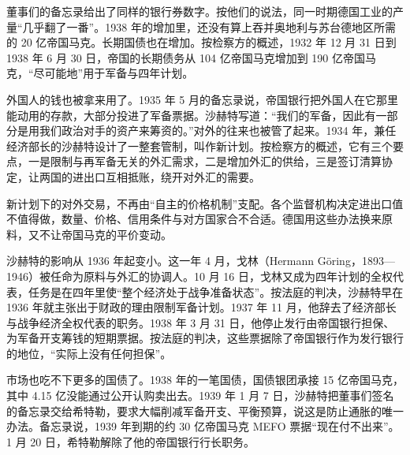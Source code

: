 董事们的备忘录给出了同样的银行券数字\cite{nca1946g}。按他们的说法，同一时期德国工业的产量“几乎翻了一番”\cite{nca1946g}。1938 年的增加里，还没有算上吞并奥地利与苏台德地区所需的 20 亿帝国马克\cite{nca1946g}。长期国债也在增加。按检察方的概述，1932 年 12 月 31 日到 1938 年 6 月 30 日，帝国的长期债务从 104 亿帝国马克增加到 190 亿帝国马克，“尽可能地”用于军备与四年计划\cite{nca1946b}。

外国人的钱也被拿来用了。1935 年 5 月的备忘录说，帝国银行把外国人在它那里能动用的存款，大部分投进了军备票据\cite{nca1946b}。沙赫特写道：“我们的军备，因此有一部分是用我们政治对手的资产来筹资的。”\cite{nca1946b}对外的往来也被管了起来。1934 年，兼任经济部长的沙赫特设计了一整套管制，叫作新计划\cite{nca1946b,nca1947}。按检察方的概述，它有三个要点，一是限制与再军备无关的外汇需求，二是增加外汇的供给，三是签订清算协定，让两国的进出口互相抵账，绕开对外汇的需要\cite{nca1946b}。

新计划下的对外交易，不再由“自主的价格机制”支配\cite{nca1946b}。各个监督机构决定进出口值不值得做，数量、价格、信用条件与对方国家合不合适\cite{nca1946b}。德国用这些办法换来原料，又不让帝国马克的平价变动。

沙赫特的影响从 1936 年起变小。这一年 4 月，戈林（Hermann Göring，1893—1946）被任命为原料与外汇的协调人\cite{nca1947,loc30}。10 月 16 日，戈林又成为四年计划的全权代表，任务是在四年里使“整个经济处于战争准备状态”\cite{nca1947}。按法庭的判决，沙赫特早在 1936 年就主张出于财政的理由限制军备计划\cite{nca1947}。1937 年 11 月，他辞去了经济部长与战争经济全权代表的职务\cite{nca1947,schacht2005}。1938 年 3 月 31 日，他停止发行由帝国银行担保、为军备开支筹钱的短期票据\cite{nca1947}。按法庭的判决，这些票据除了帝国银行作为发行银行的地位，“实际上没有任何担保”\cite{nca1947}。

市场也吃不下更多的国债了。1938 年的一笔国债，国债银团承接 15 亿帝国马克，其中 4.15 亿没能通过公开认购卖出去\cite{nca1946g}。1939 年 1 月 7 日，沙赫特把董事们签名的备忘录交给希特勒，要求大幅削减军备开支、平衡预算，说这是防止通胀的唯一办法\cite{nca1947}。备忘录说，1939 年到期的约 30 亿帝国马克 MEFO 票据“现在付不出来”\cite{nca1946g}。1 月 20 日，希特勒解除了他的帝国银行行长职务\cite{nca1947,schacht2005}。


